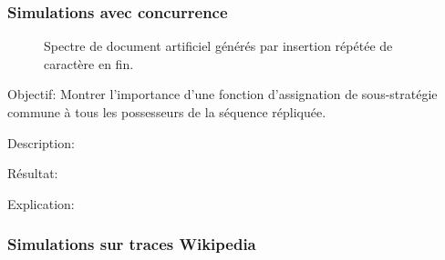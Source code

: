 \subsubsection{Simulations avec concurrence}

\begin{figure}
  \centering
  \hspace{10pt}
  \caption{Spectre de document artificiel générés par insertion répétée de caractère
  en fin.}
\end{figure}

\begin{asparadesc}
\item [Objectif:]  Montrer l'importance d'une fonction
  d'assignation de sous-stratégie commune à tous les possesseurs de la séquence
  répliquée.
\item [Description:]
\item [Résultat:]
\item [Explication:]
\end{asparadesc}

\subsubsection{Simulations sur traces Wikipedia}

